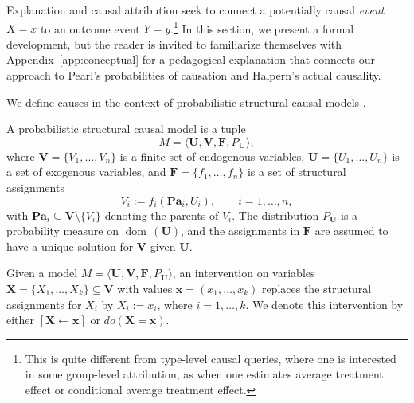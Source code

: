 \documentclass[anon,12pt]{clear2026} %
\newcommand{\dom}{\operatorname{dom}\,}
\begin{document}
Explanation and causal attribution seek to connect a potentially causal \textit{event} $X=x$ to an outcome event $Y=y$.\footnote{This is quite different from type-level causal queries, where one is interested in some group-level attribution, as when one estimates average treatment effect or conditional average treatment effect.} 
In this section, we present a formal development, but the reader is invited to 
familiarize themselves with  Appendix~\ref{app:conceptual} for a pedagogical explanation that connects our approach to Pearl's probabilities of causation and Halpern's actual causality.



We define causes in the context of probabilistic structural causal models \citep{causalityPearl}.

\begin{definition}
A probabilistic structural causal model is a tuple
\[
M = \langle \mathbf{U}, \mathbf{V}, \mathbf{F}, P_{\mathbf{U}} \rangle,
\]
where \(\mathbf{V} = \{V_1,\dots,V_n\}\) is a finite set of endogenous variables,
\(\mathbf{U} = \{U_1,\dots,U_n\}\) is a set of exogenous variables,
and \(\mathbf{F} = \{f_1,\dots,f_n\}\) is a set of structural assignments
\[
V_i := f_i(\mathbf{Pa}_i, U_i), \qquad i = 1,\dots,n,
\]
with \(\mathbf{Pa}_i \subseteq \mathbf{V}\setminus\{V_i\}\) denoting the parents of \(V_i\).
The distribution \(P_{\mathbf{U}}\) is a probability measure on $\dom(\mathbf{U})$,
and the assignments in \(\mathbf{F}\) are assumed to have a unique solution for \(\mathbf{V}\) given \(\mathbf{U}\).
\end{definition}

\begin{definition}[Interventions]
Given a model \(M = \langle \mathbf{U}, \mathbf{V}, \mathbf{F}, P_{\mathbf{U}} \rangle\),
an intervention on variables \(\mathbf{X} = \{X_1, \dots, X_k\} \subseteq \mathbf{V}\)
with values \(\mathbf{x} = (x_1, \dots, x_k)\) replaces the structural assignments for \(X_i\) by $X_i := x_i$, where $i = 1, \dots, k$.  
We denote this intervention by either \([\mathbf{X} \leftarrow \mathbf{x}]\) or $do(\mathbf{X} = \mathbf{x})$.
\end{definition}
\end{document}
